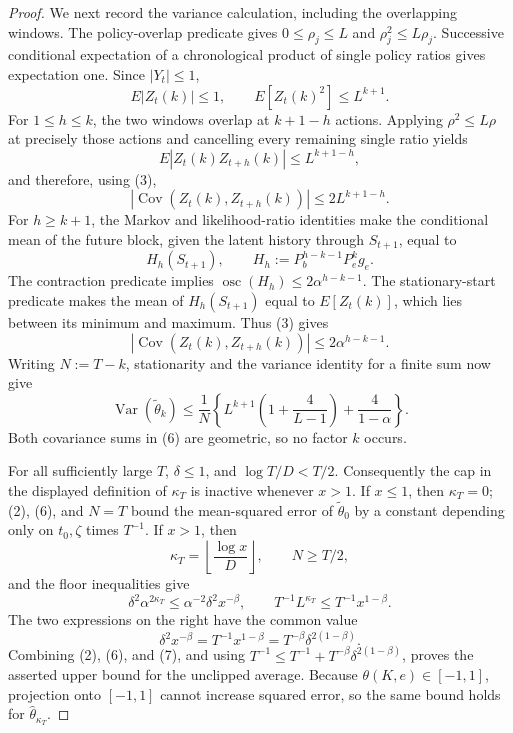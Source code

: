 \documentclass{article}
\begin{document}
\begin{proof}
We next record the variance calculation, including the overlapping windows.  The policy-overlap predicate gives \(0\le\rho_j\le L\) and \(\rho_j^2\le L\rho_j\).  Successive conditional expectation of a chronological product of single policy ratios gives expectation one.  Since \(|Y_t|\le1\),
\[
 E|Z_t(k)|\le1,
 \qquad
 E[Z_t(k)^2]\le L^{k+1}. \tag{3}
\]
For \(1\le h\le k\), the two windows overlap at \(k+1-h\) actions.  Applying \(\rho^2\le L\rho\) at precisely those actions and cancelling every remaining single ratio yields
\[
 E|Z_t(k)Z_{t+h}(k)|\le L^{k+1-h},
\]
and therefore, using (3),
\[
 |\operatorname{Cov}(Z_t(k),Z_{t+h}(k))|
 \le2L^{k+1-h}. \tag{4}
\]
For \(h\ge k+1\), the Markov and likelihood-ratio identities make the conditional mean of the future block, given the latent history through \(S_{t+1}\), equal to
\[
 H_h(S_{t+1}),
 \qquad H_h:=P_b^{h-k-1}P_e^kg_e.
\]
The contraction predicate implies
\(\operatorname{osc}(H_h)\le2\alpha^{h-k-1}\).  The stationary-start predicate makes the mean of \(H_h(S_{t+1})\) equal to \(E[Z_t(k)]\), which lies between its minimum and maximum.  Thus (3) gives
\[
 |\operatorname{Cov}(Z_t(k),Z_{t+h}(k))|
 \le2\alpha^{h-k-1}. \tag{5}
\]
Writing \(N:=T-k\), stationarity and the variance identity for a finite sum now give
\[
 \operatorname{Var}(\widetilde\theta_k)
 \le \frac1N\left\{
 L^{k+1}\left(1+\frac4{L-1}\right)
 +\frac4{1-\alpha}\right\}. \tag{6}
\]
Both covariance sums in (6) are geometric, so no factor \(k\) occurs.

For all sufficiently large \(T\), \(\delta\le1\), and
\(\log T/D<T/2\).  Consequently the cap in the displayed definition of \(\kappa_T\) is inactive whenever \(x>1\).  If \(x\le1\), then \(\kappa_T=0\); (2), (6), and \(N=T\) bound the mean-squared error of \(\widetilde\theta_0\) by a constant depending only on \(t_0,\zeta\) times \(T^{-1}\).  If \(x>1\), then
\[
 \kappa_T=\left\lfloor\frac{\log x}{D}\right\rfloor,
 \qquad N\ge T/2,
\]
and the floor inequalities give
\[
 \delta^2\alpha^{2\kappa_T}
 \le\alpha^{-2}\delta^2x^{-\beta},
 \qquad
 T^{-1}L^{\kappa_T}
 \le T^{-1}x^{1-\beta}.
\]
The two expressions on the right have the common value
\[
 \delta^2x^{-\beta}
 =T^{-1}x^{1-\beta}
 =T^{-\beta}\delta^{2(1-\beta)}. \tag{7}
\]
Combining (2), (6), and (7), and using \(T^{-1}\le T^{-1}+T^{-\beta}\delta^{2(1-\beta)}\), proves the asserted upper bound for the unclipped average.  Because \(\theta(K,e)\in[-1,1]\), projection onto \([-1,1]\) cannot increase squared error, so the same bound holds for \(\widehat\theta_{\kappa_T}\).


\end{proof}
\end{document}
